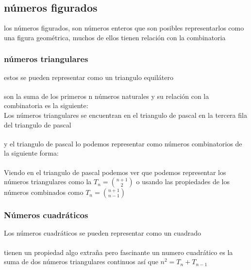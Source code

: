 \subsection{números figurados}
los números figurados, son números enteros  que son posibles representarlos como una figura geométrica, muchos de ellos tienen relación con la combinatoria
\subsubsection{números triangulares}
estos se pueden representar como un triangulo equilátero
\\
\\son la suma de los primeros n números naturales y su relación con la combinatoria es la siguiente:
\\Los números triangulares se encuentran en el triangulo de pascal en la tercera fila del triangulo de pascal
\\
\\y el triangulo de pascal lo podemos representar como números combinatorios de la siguiente forma:
\\
\\Viendo en el triangulo de pascal podemos ver que podemos representar los números triangulares como la  $T_{n}=\binom{n+1}{2} $ o usando las propiedades de los números combinados como   $T_{n}=\binom{n+1}{n-1}$
\subsubsection{Números cuadráticos}
Los números cuadráticos se pueden representar como un cuadrado
\\
\\tienen un propiedad  algo extraña pero fascinante un numero cuadrático es la suma de dos números triangulares continuos así que $n^{2} = T_{n} + T_{n-1}$
